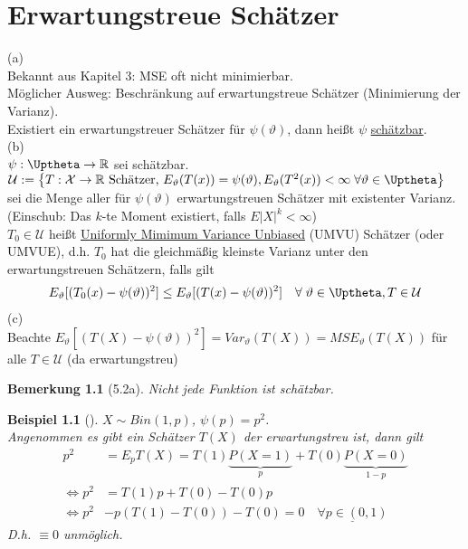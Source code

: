 \documentclass[a4paper,openany]{book}
\theoremstyle{mytheoremstyle}
\newtheorem*{bei}{Beispiel}
\newtheorem*{bem}{Bemerkung}
\theoremstyle{mytheoremstyle2}
\begin{document}
\chapter{Erwartungstreue Schätzer}
\begin{defi}{5.1}{}
  (a) \\
  Bekannt aus Kapitel 3: MSE oft nicht minimierbar. \\
  Möglicher Ausweg: Beschränkung auf erwartungstreue Schätzer (Minimierung der Varianz). \\
  Existiert ein erwartungstreuer Schätzer für $\psi (\vartheta )$, dann heißt $\psi $ \underline{schätzbar}. \\
  (b) \\
  $\psi :\Uptheta\to \mathbb{R}$ sei schätzbar. $\mathcal{U}:=\left\{T:\mathcal{X}\to \mathbb{R} \text{ Schätzer, }E _{\vartheta }(T(x))=\psi (\vartheta ),E _{\vartheta }(T^2(x))<\infty \; \forall \vartheta \in\Uptheta\right\}$ \\
  sei die Menge aller für $\psi (\vartheta )$ erwartungstreuen Schätzer  mit existenter Varianz.  \\
  (Einschub: Das $k$-te Moment existiert, falls $E|X|^k<\infty $)  \\
  $T_0 \in \mathcal{U}$ heißt \underline{\underline{U}niformly \underline{M}imimum \underline{V}ariance \underline{U}nbiased} (UMVU) Schätzer (oder UMVUE), d.h. $T_0$ hat die gleichmäßig kleinste Varianz unter den erwartungstreuen Schätzern, falls gilt 
  \begin{align*}
    E _{\vartheta }[(T_0(x)-\psi (\vartheta ))^2]\leq E _{\vartheta }[(T(x)-\psi (\vartheta ))^2]\quad \forall\;\vartheta \in \Uptheta, T \in \mathcal{U}
  \end{align*}
  (c)\\
  Beachte $E _{\vartheta }[(T(X)-\psi (\vartheta ))^2]=Var _{\vartheta }(T(X))=MSE _{\vartheta }(T(X))$ für alle $T \in \mathcal{U}$ (da erwartungstreu)  
\end{defi}
\begin{bem}[5.2a]
  Nicht jede Funktion ist schätzbar.
\end{bem}
\begin{bei}[]
  $X\sim Bin(1,p)$, $\psi (p)=p^2$. \\
  Angenommen es gibt ein Schätzer $T(X)$ der erwartungstreu ist, dann gilt 
  \begin{align*}
    p^2&=E_pT(X)=T(1)\underbrace{P(X=1)}_{p}+T(0)\underbrace{P(X=0)}_{1-p}\\
    \Leftrightarrow p^2&=T(1)p+T(0)-T(0)p \\
    \Leftrightarrow p^2&-p(T(1)-T(0))-T(0)=0 \quad \underline{\forall p \in (0,1)}
  \end{align*}
  D.h. $\equiv 0$ unmöglich. 
\end{bei}
\end{document}
